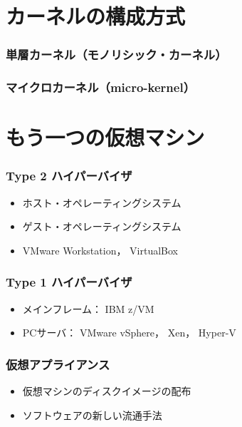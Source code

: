 \documentclass[unicode,handout]{beamer}                   %
\begin{document}
\section{カーネルの構成方式}
\begin{frame}
  \frametitle{単層カーネル（モノリシック・カーネル）}
\end{frame}

\begin{frame}
  \frametitle{マイクロカーネル（micro-kernel）}
\end{frame}

\section{もう一つの仮想マシン}
\begin{frame}
  \frametitle{Type 2 ハイパーバイザ}
  \begin{itemize}
  \item ホスト・オペレーティングシステム
  \item ゲスト・オペレーティングシステム
  \item VMware Workstation， VirtualBox
  \end{itemize}
\end{frame}

\begin{frame}
  \frametitle{Type 1 ハイパーバイザ}
  \begin{itemize}
  \item メインフレーム： IBM z/VM
  \item PCサーバ： VMware vSphere， Xen， Hyper-V
  \end{itemize}
\end{frame}

\begin{frame}
  \frametitle{仮想アプライアンス}
  \begin{itemize}
  \item 仮想マシンのディスクイメージの配布
  \item ソフトウェアの新しい流通手法
  \end{itemize}
\end{frame}
\end{document}
